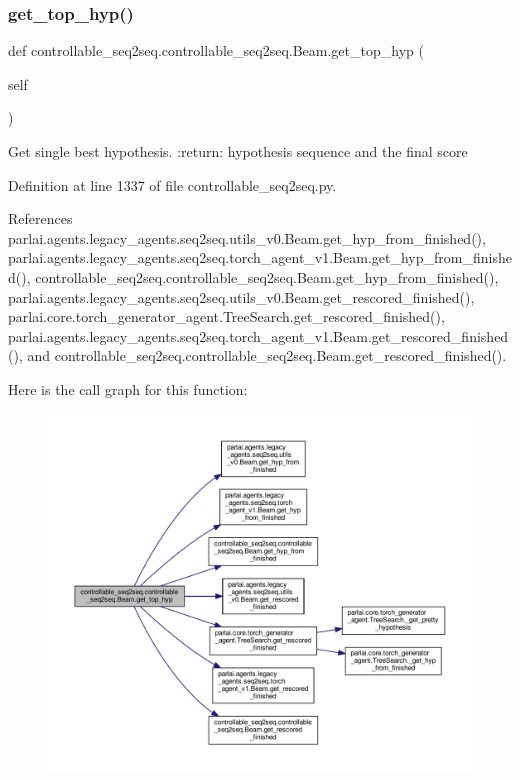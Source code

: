 \subsubsection{\texorpdfstring{get\+\_\+top\+\_\+hyp()}{get\_top\_hyp()}}
{\footnotesize\ttfamily def controllable\+\_\+seq2seq.\+controllable\+\_\+seq2seq.\+Beam.\+get\+\_\+top\+\_\+hyp (\begin{DoxyParamCaption}\item[{}]{self }\end{DoxyParamCaption})}

\begin{DoxyVerb}Get single best hypothesis.
:return: hypothesis sequence and the final score
\end{DoxyVerb}
 

Definition at line 1337 of file controllable\+\_\+seq2seq.\+py.



References parlai.\+agents.\+legacy\+\_\+agents.\+seq2seq.\+utils\+\_\+v0.\+Beam.\+get\+\_\+hyp\+\_\+from\+\_\+finished(), parlai.\+agents.\+legacy\+\_\+agents.\+seq2seq.\+torch\+\_\+agent\+\_\+v1.\+Beam.\+get\+\_\+hyp\+\_\+from\+\_\+finished(), controllable\+\_\+seq2seq.\+controllable\+\_\+seq2seq.\+Beam.\+get\+\_\+hyp\+\_\+from\+\_\+finished(), parlai.\+agents.\+legacy\+\_\+agents.\+seq2seq.\+utils\+\_\+v0.\+Beam.\+get\+\_\+rescored\+\_\+finished(), parlai.\+core.\+torch\+\_\+generator\+\_\+agent.\+Tree\+Search.\+get\+\_\+rescored\+\_\+finished(), parlai.\+agents.\+legacy\+\_\+agents.\+seq2seq.\+torch\+\_\+agent\+\_\+v1.\+Beam.\+get\+\_\+rescored\+\_\+finished(), and controllable\+\_\+seq2seq.\+controllable\+\_\+seq2seq.\+Beam.\+get\+\_\+rescored\+\_\+finished().

Here is the call graph for this function\+:
\nopagebreak
\begin{figure}[H]
\begin{center}
\leavevmode
\includegraphics[width=350pt]{classcontrollable__seq2seq_1_1controllable__seq2seq_1_1Beam_a5224a8abe07503fe549bc6e2140eb244_cgraph}
\end{center}
\end{figure}


